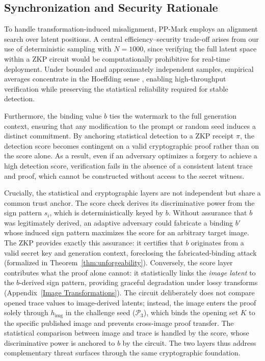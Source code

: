 \documentclass{article}
\theoremstyle{plain}
\theoremstyle{definition}
\theoremstyle{remark}
\begin{document}
  
\subsection{Synchronization and Security Rationale}
To handle transformation-induced misalignment, PP-Mark employs an alignment search over
latent positions. A central efficiency--security trade-off arises from our use of
deterministic sampling with \(N=1000\), since verifying the full latent space within a ZKP
circuit would be computationally prohibitive for real-time deployment. Under bounded and
approximately independent samples, empirical averages concentrate in the Hoeffding sense
\cite{hoeffding1963}, enabling high-throughput verification while preserving the
statistical reliability required for stable detection.

Furthermore, the binding value \(b\) ties the watermark to the full generation context,
ensuring that any modification to the prompt or random seed induces a distinct
commitment. By anchoring statistical detection to a ZKP receipt \(\pi\), the detection
score becomes contingent on a valid cryptographic proof rather than on the score alone.
As a result, even if an adversary optimizes a forgery to achieve a high detection score,
verification fails in the absence of a consistent latent trace and proof, which cannot be
constructed without access to the secret witness.

Crucially, the statistical and cryptographic layers are not independent but share a common trust anchor. The score check derives its discriminative power from the sign pattern $s_i$, which is deterministically keyed by $b$. Without assurance that $b$ was legitimately derived, an adaptive adversary could fabricate a binding $b'$ whose induced sign pattern maximizes the score for an arbitrary target image. The ZKP provides exactly this assurance: it certifies that $b$ originates from a valid secret key and generation context, foreclosing the fabricated-binding attack (formalized in Theorem~\ref{thm:unforgeability}). Conversely, the score layer contributes what the proof alone cannot: it statistically links the \emph{image latent} to the $b$-derived sign pattern, providing graceful degradation under lossy transforms (Appendix~\ref{Image Transformations}). The circuit deliberately does not compare opened trace values to image-derived latents; instead, the image enters the proof solely through $h_{\mathrm{img}}$ in the challenge seed ($\mathcal{P}_3$), which binds the opening set $K$ to the specific published image and prevents cross-image proof transfer. The statistical comparison between image and trace is handled by the score, whose discriminative power is anchored to $b$ by the circuit. The two layers thus address complementary threat surfaces through the same cryptographic foundation.
\end{document}
